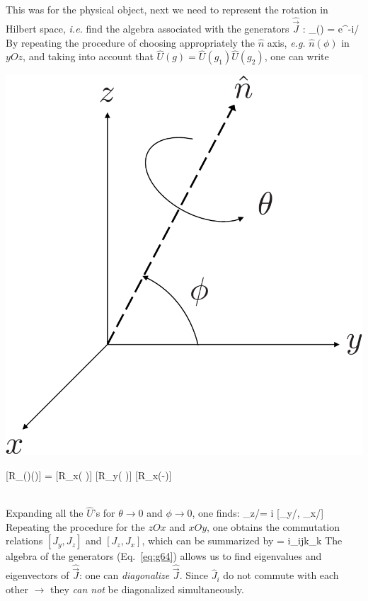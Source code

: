 \documentclass[12pt]{article}
\begin{document}
This was for the physical object, next we need to
represent the rotation in Hilbert space, \textit{i.e.} find
the algebra associated with the generators $\hat{\vec{J}}$ :
\be
{}_{}(\theta) = e^{-i/\hbar {}\cdot {}}
\ee
By repeating the procedure of choosing appropriately the
$\hat{n}$ axis, \textit{e.g.} $\hat{n}(\phi)$ in $yOz$, and taking into account
that $\hat{U}(g) = \hat{U}(g_1)\hat{U}(g_2)$, one can write\\[0.6em]
\begin{minipage}{0.35\textwidth}
\includegraphics[width=\textwidth]{Figures/simpleRotation-crop.pdf}
\end{minipage}%
\begin{minipage}{0.65\textwidth}
\be
{}[R_{(\phi)}(\theta)] = 
[R_x( \phi)] [R_y( \theta)] [R_x(-\phi)]   
\ee
\end{minipage}\\[0.6em]%
Expanding all the $\hat{U}$'s for $\theta\to 0$ and $\phi\to 0$,
one finds:
\be
{}_z/\hbar = i [_y/\hbar, _x/\hbar]
\ee
Repeating the procedure for the $zOx$ and $xOy$,
one obtains the commutation relations $[J_y, J_z]$ and
$[J_z, J_x]$, which can be summarized by
 = i\hbar \epsilon_{ijk}_k
\label{eq:g64}
\ee
The algebra of the generators (Eq.~\eqref{eq:g64}) allows us to find eigenvalues
and eigenvectors of $\hat{\vec{J}}$: one can \emph{diagonalize} $\hat{\vec{J}}$.
Since $\hat{J}_i$ do not commute with each other $\rightarrow$ they
\emph{can not} be diagonalized simultaneously.
\end{document}
